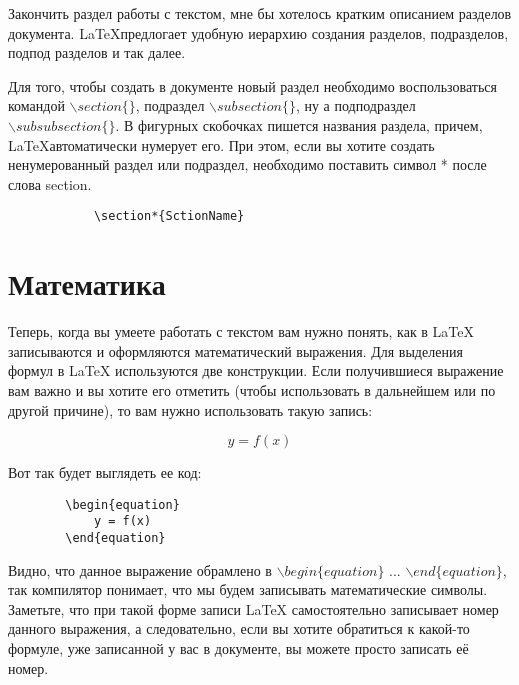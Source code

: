     Закончить раздел работы с текстом, мне бы хотелось кратким описанием разделов документа.
    \LaTeX предлогает удобную иерархию создания разделов, подразделов, подпод разделов и так далее.
    
    Для того, чтобы создать в документе новый раздел необходимо воспользоваться
    командой $\backslash section\{\}$, подраздел $\backslash subsection\{\}$,
    ну а подподраздел $\backslash subsubsection\{\}$. В фигурных скобочках пишется названия раздела,
    причем, \LaTeX автоматически нумерует его. При этом, если вы хотите создать ненумерованный
    раздел или подраздел, необходимо поставить символ * после слова section.

    \begin{center}
        \begin{verbatim}
            \section*{SctionName}
        \end{verbatim}
    \end{center}

    \section{Математика}

    Теперь, когда вы умеете работать с текстом вам нужно понять, как в \LaTeX{} записываются и оформляются математический выражения. Для выделения формул в \LaTeX{} используются две конструкции. Если получившиеся выражение вам важно и вы хотите его отметить (чтобы использовать в дальнейшем или по другой причине), то вам нужно использовать такую запись:

    \begin{equation}
        y = f(x)
    \end{equation}
    
    Вот так будет выглядеть ее код:    
    
    \begin{verbatim}
        \begin{equation}
            y = f(x)
        \end{equation}
    \end{verbatim}   
    
    Видно, что данное выражение обрамлено в $\backslash begin\{equation\}$ ... $\backslash end\{equation\}$, так компилятор понимает, что мы будем записывать математические символы. Заметьте, что при такой форме записи \LaTeX{} самостоятельно записывает номер данного выражения, а следовательно, если вы хотите обратиться к какой-то формуле, уже записанной у вас в документе, вы можете просто записать её номер.
    
